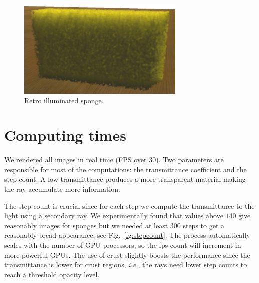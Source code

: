 \begin{figure}[htb!]
  \centerline{\includegraphics[width=8cm]{fig7}}
  \caption{Retro illuminated sponge.}
  \label{fg:fig7}
\end{figure}


\section{Computing times}

We rendered all images in real time (FPS over 30). Two parameters are responsible for most of the computations: the transmittance coefficient and the step count.
A low transmittance produces a more transparent material making the ray accumulate more information.

The step count is crucial since for each step we compute the transmittance to the light using a secondary ray.
We experimentally found that values above $140$ give reasonably images for sponges but we needed at least $300$ steps to get a reasonably bread appearance, see Fig.~\ref{fg:stepcount}.
The process automatically scales with the number of GPU processors, so the fps count will increment in more powerful GPUs. 
The use of crust slightly boosts the performance since the transmittance is lower for crust regions, {\em i.e.}, the rays need lower step counts to reach a threshold opacity level.





